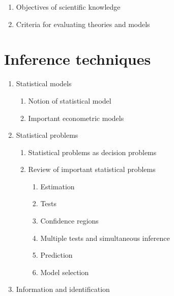 \documentclass[titlepage,11pt,amstex]{article}
\begin{document}
\begin{enumerate}
\item \label{Objectives}Objectives of scientific knowledge

\item \label{Criteria}Criteria for evaluating theories and models
\end{enumerate}

\section{Inference \textbf{techniques \label{Inference techniques}}}

\begin{enumerate}
\item Statistical models

\begin{enumerate}
\item \label{Notion of statistical model}Notion of statistical model

\item \label{Important econometric models}Important econometric models
\end{enumerate}

\item \label{Statistical models}Statistical problems

\begin{enumerate}
\item \label{Statistics and decision theory}Statistical problems as decision
problems

\item \label{R: Important statistical problems}Review of important
statistical problems

\begin{enumerate}
\item Estimation

\item Tests

\item Confidence regions

\item Multiple tests and simultaneous inference

\item Prediction

\item Model selection
\end{enumerate}
\end{enumerate}

\item Information and identification


\end{enumerate}
\end{document}
